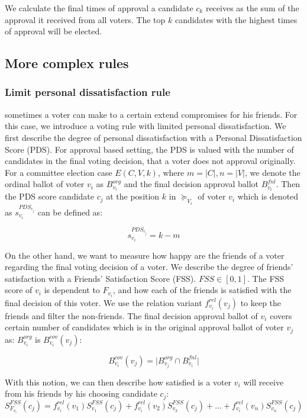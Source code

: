 \documentclass{article}
\begin{document}
We calculate the final times of approval a candidate $c_k$ receives as the sum of the approval it received from all voters. The top $k$ candidates with the highest times of approval will be elected.

\subsection{More complex rules}

\subsubsection{Limit personal dissatisfaction rule}
sometimes a voter can make to a certain extend compromises for his friends. For this case, we introduce a voting rule with limited personal dissatisfaction. We first describe the degree of personal dissatisfaction with a Personal Dissatisfaction Score (PDS). For approval based setting, the PDS is valued with the number of candidates in the final voting decision, that a voter does not approval originally. For a committee election case $E(C,V,k)$,  where $m = \vert C \vert, n= \vert V \vert$,  we denote the ordinal ballot of voter $v_i$ as $B_{v_i}^{org}$ and the final decision approval ballot $B_{v_i}^{fnl}$. Then the PDS score candidate $c_j$ at the position $k$ in $\succeq_{V_i}$ of voter $v_i$ which is denoted as $s_{v_i}^{PDS_{c_j}}$ can be defined as:

\begin{equation}
s_{v_i}^{PDS_{c_j}}= k-m
\label{CP:PDS}
\end{equation}

On the other hand, we want to measure how happy are the friends of a voter regarding the final voting decision of a voter. We describe the degree of friends' satisfaction with a Friends' Satisfaction Score (FSS). $FSS \in [0,1]$. The FSS score of $v_i$ is dependent to $F_{v_i}$, and how each of the friends is satisfied with the final decision of this voter. We use the relation variant $f_{v_i}^{rel}(v_j)$ to keep the friends and filter the non-friends. The final decision approval ballot of $v_i$ covers certain number of candidates which is in the original approval ballot of voter $v_j$ as: $B_{v_i}^{org}$  is $B_{v_i}^{cov}(v_j)$:

\begin{equation}
    B_{v_i}^{cov}(v_j) = \vert B_{v_j}^{org} \cap B_{v_i}^{fnl} \vert
\end{equation}

With this notion, we can then describe how satisfied is a voter $v_i$  will receive from his friends by his choosing candidate $c_j$:
\begin{equation}
S_{F_{v_i}}^{FSS}(c_j)=f_{v_i}^{rel}(v_1)S_{v_1}^{FSS}(c_j)+ f_{v_i}^{rel}(v_2)S_{v_2}^{FSS}(c_j)+ \dots +f_{v_i}^{rel}(v_n)S_{v_n}^{FSS}(c_j)
\end{equation}
\end{document}

